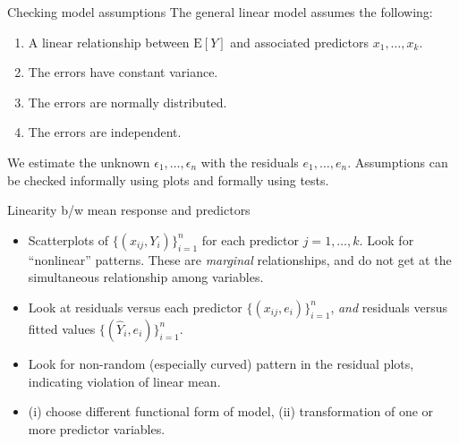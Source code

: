 \documentclass{beamer}
\newcommand{\E}{\mathrm{E}}
\begin{document}
\begin{frame}{Checking model assumptions}
The general linear model assumes the following:
\begin{enumerate} 
\item A linear relationship between $\E[Y]$ and associated predictors $x_1, \ldots, x_k$.
\item The errors have constant variance.
\item The errors are normally distributed.
\item The errors are independent.
\end{enumerate}
\pause
We estimate the unknown $\epsilon_1,\ldots,  \epsilon_n$ with the residuals $e_1,\ldots,e_n$. \pause Assumptions can be checked informally using plots and formally using tests.
\end{frame}

\begin{frame}{Linearity b/w mean response and predictors}
\begin{itemize}
\item Scatterplots of $\{(x_{ij}, Y_i)\}_{i=1}^n$ for each predictor $j = 1, \ldots, k$.
Look for ``nonlinear'' patterns. These are \textit{marginal}
relationships, and do not get at the simultaneous relationship
among variables.

\item<2-> Look at residuals versus each predictor $\{(x_{ij}, e_i)\}_{i=1}^n$, \textit{and}
 residuals versus fitted values $\{(\hat{Y}_i, e_i)\}_{i=1}^n$. 
 
\item<3-> Look for non-random (especially curved) pattern in the
residual plots, indicating violation of linear mean.

\item<4->  (i) choose different functional form of model, (ii)
transformation of one or more predictor variables.

\end{itemize}
\end{frame}
\end{document}
